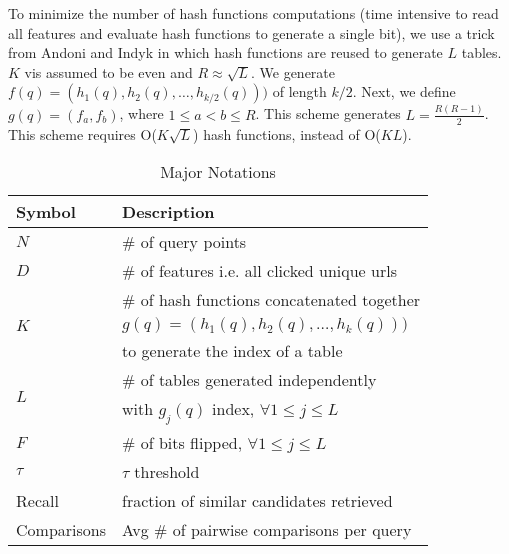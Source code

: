 

To minimize the number of hash functions computations (time intensive to read all features and 
evaluate hash functions to generate a single bit), we use a trick from Andoni and Indyk  
in which hash functions are reused to generate $L$ tables. $K$ vis assumed to be even and $R \approx	\sqrt L$. 
We generate $f(q)=(h_1(q),h_2(q),\dots,h_{k/2}(q)))$ of length $k/2$. 
Next, we define $g(q)=(f_a,f_b)$, where $1\leq a < b \leq R$. This scheme generates $L= \frac{R (R -1)}{2}$. 
This scheme requires O($K  \sqrt L$) hash functions, instead of O($KL$).    

 \begin{table}
\centering
{
\small \addtolength{\tabcolsep}{-4.5pt}
\begin{tabular}{ll}
\hline
\hline
 \textbf{Symbol} &  \textbf{Description} \\
\hline 
$N$ & \# of query points \\
$D$ & \# of features i.e. all clicked unique urls \\
\hline
\multirow{3}{*}{$K$} & \# of hash functions concatenated together \\ 
   & $g(q)=(h_1(q),h_2(q),\dots,h_k(q)))$ \\ 
	 & to generate the index of a table \\
\hline
 \multirow{2}{*}{$L$} & \# of tables generated independently \\ 
	  &  with $g_j(q)$ index, $\forall 1 \leq j \leq  L$  \\
\hline
$F$ & \# of bits flipped, $\forall 1 \leq j \leq  L$   \\
$\tau$ & $\tau$ threshold \\
Recall & fraction of similar candidates retrieved \\
Comparisons & Avg \# of pairwise comparisons per query  \\
\hline 
\end{tabular}
\caption{\footnotesize{Major Notations}}
}
\label{tab:notation}
\end{table}


